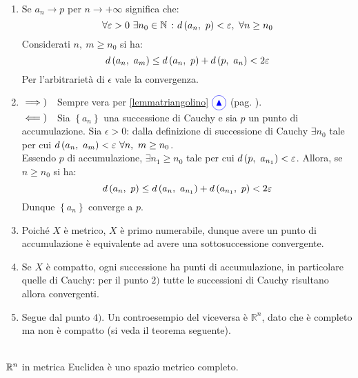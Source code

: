 \begin{demonstration}~{}
	\begin{enumerate}[label=\Roman*]
		\item Se $a_n\to p$ per $n\to +\infty$ significa che:
		\begin{equation*}
			\forall \epsilon>0\ \exists n_0\in\naturalset\ \colon \mvf{d}{a_n}{p}<\epsilon,\ \forall n\geq n_0
		\end{equation*}
	Considerati $n,\ m\geq n_0$ si ha:
	\begin{equation}
		d\left(a_n,\ a_m\right)\leq d\left(a_n,\ p\right)+d\left(p,\ a_n\right)< 2\varepsilon
	\end{equation}
Per l'arbitrarietà di $\epsilon$ vale la convergenza.
\item $\implies)\quad$Sempre vera per \ref{lemmatriangolino} $\textcolor{blue}{\circled{{\large \blacktriangle}}}$ (pag. \pageref{lemmatriangolino}).\\
$\impliedby)\quad$Sia $\left\{a_n\right\}$ una successione di Cauchy e sia $p$ un punto di accumulazione. Sia $\epsilon>0$: dalla definizione di successione di Cauchy $\exists n_0$ tale per cui $\mvf{d}{a_n}{a_m}<\epsilon\ \forall n,\ m\geq n_0$.\\
Essendo $p$ di accumulazione, $\exists n_1\geq n_0$ tale per cui $d\left(p,\ a_{n_1}\right)<\varepsilon$. Allora, se $n\geq n_0$ si ha:
	\begin{equation*}
	d\left(a_n,\ p\right)\leq d\left(a_n,\ a_{n_1}\right)+d\left(a_{n_1},\ p\right)< 2\varepsilon
\end{equation*}
Dunque $\left\{a_n\right\}$ converge a $p$.
\item Poiché $X$ è metrico, $X$ è primo numerabile, dunque avere un punto di accumulazione è equivalente ad avere una sottosuccessione convergente.
\item Se $X$ è compatto, ogni successione ha punti di accumulazione, in particolare quelle di Cauchy: per il punto $2)$ tutte le successioni di Cauchy risultano allora convergenti.
\item Segue dal punto $4)$. Un controesempio del viceversa è $\mathbb{R}^n$, dato che è completo ma non è compatto (si veda il teorema seguente).
\end{enumerate}
\vspace{-3mm}
\end{demonstration}
\begin{theorema}~{}\\
	$\mathbb{R}^n$ in metrica Euclidea è uno spazio metrico completo.
\end{theorema}
